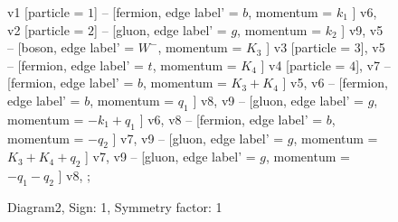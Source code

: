 \documentclass{revtex4}
\begin{document}
\begin{figure}[!htb]
\begin{center}
{    %
v1 [particle = \(1\)] -- [fermion, edge label' = \(b\), momentum = \(k_{1}\) ] v6, 
v2 [particle = \(2\)] -- [gluon, edge label' = \(g\), momentum = \(k_{2}\) ] v9, 
v5 -- [boson, edge label' = \(W^{-}\), momentum = \(K_{3}\) ] v3 [particle = \(3\)], 
v5 -- [fermion, edge label' = \(t\), momentum = \(K_{4}\) ] v4 [particle = \(4\)], 
v7 -- [fermion, edge label' = \(b\), momentum = \(K_{3} + K_{4}\) ] v5, 
v6 -- [fermion, edge label' = \(b\), momentum = \(q_{1}\) ] v8, 
v9 -- [gluon, edge label' = \(g\), momentum = \(-k_{1} + q_{1}\) ] v6, 
v8 -- [fermion, edge label' = \(b\), momentum = \(-q_{2}\) ] v7, 
v9 -- [gluon, edge label' = \(g\), momentum = \(K_{3} + K_{4} + q_{2}\) ] v7, 
v9 -- [gluon, edge label' = \(g\), momentum = \(-q_{1} - q_{2}\) ] v8, 
};
\end{center}
\caption{Diagram2, Sign: 1, Symmetry factor: 1}
\end{figure}
\newpage
\end{document}
